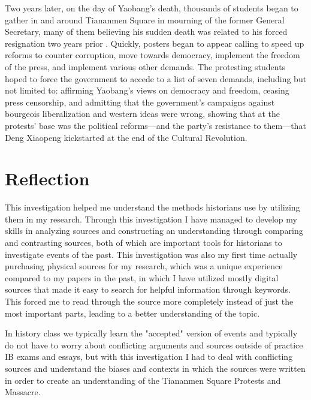\documentclass{paper}
\begin{document}
Two years later, on the day of Yaobang's death, thousands of students began to gather in and around Tiananmen Square in mourning of the former General Secretary, many of them believing his sudden death was related to his forced resignation two years prior \autocite{calhoun}.
Quickly, posters began to appear calling to speed up reforms to counter corruption, move towards democracy, implement the freedom of the press, and implement various other demands.
The protesting students hoped to force the government to accede to a list of seven demands, including but not limited to: affirming Yaobang's views on democracy and freedom, ceasing press censorship, and admitting that the government's campaigns against bourgeois liberalization and western ideas were wrong, showing that at the protests' base was the political reforms---and the party's resistance to them---that Deng Xiaopeng kickstarted at the end of the Cultural Revolution.

\newpage

\section{Reflection}
This investigation helped me understand the methods historians use by utilizing them in my research.
Through this investigation I have managed to develop my skills in analyzing sources and constructing an understanding through comparing and contrasting sources, both of which are important tools for historians to investigate events of the past.
This investigation was also my first time actually purchasing physical sources for my research, which was a unique experience compared to my papers in the past, in which I have utilized mostly digital sources that made it easy to search for helpful information through keywords.
This forced me to read through the source more completely instead of just the most important parts, leading to a better understanding of the topic.

In history class we typically learn the "accepted" version of events and typically do not have to worry about conflicting arguments and sources outside of practice IB exams and essays, but with this investigation I had to deal with conflicting sources and understand the biases and contexts in which the sources were written in order to create an understanding of the Tiananmen Square Protests and Massacre.

\singlespacing
\newpage
\printbibliography
\thispagestyle{empty}
\end{document}

